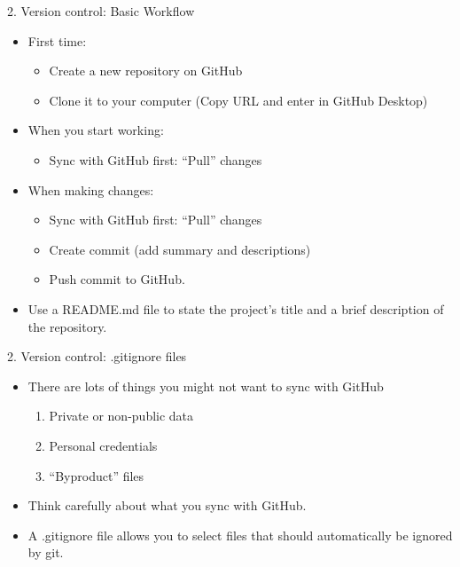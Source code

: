 \documentclass[
  ignorenonframetext,
  aspectratio=169,
]{beamer}
\providecommand{\tightlist}{%
  \setlength{\itemsep}{0pt}\setlength{\parskip}{0pt}}
\begin{document}
\begin{frame}{2. Version control: Basic Workflow}
\label{version-control-basic-workflow}
\begin{itemize}
\tightlist
\item
  First time:

  \begin{itemize}
  \tightlist
  \item
    Create a new repository on GitHub
  \item
    Clone it to your computer (Copy URL and enter in GitHub Desktop)
  \end{itemize}
\item
  When you start working:

  \begin{itemize}
  \tightlist
  \item
    Sync with GitHub first: ``Pull'' changes
  \end{itemize}
\item
  When making changes:

  \begin{itemize}
  \tightlist
  \item
    Sync with GitHub first: ``Pull'' changes
  \item
    Create commit (add summary and descriptions)
  \item
    Push commit to GitHub.
  \end{itemize}
\item
  Use a README.md file to state the project's title and a brief
  description of the repository.
\end{itemize}
\end{frame}

\begin{frame}{2. Version control: .gitignore files}
\label{version-control-.gitignore-files}
\begin{itemize}
\tightlist
\item
  There are lots of things you might not want to sync with GitHub

  \begin{enumerate}
  \tightlist
  \item
    Private or non-public data
  \item
    Personal credentials
  \item
    ``Byproduct'' files
  \end{enumerate}
\item
  Think carefully about what you sync with GitHub.
\item
  A .gitignore file allows you to select files that should automatically
  be ignored by git.
\end{itemize}
\end{frame}
\end{document}
